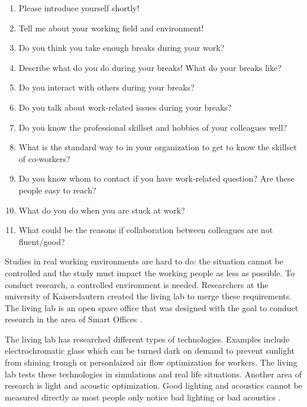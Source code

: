 \documentclass[english]{tktltiki}
\begin{document}
\begin{enumerate}
\item Please introduce yourself shortly!
\item Tell me about your working field and environment! 
\item Do you think you take enough breaks during your work? 
\item Describe what do you do during your breaks! What do your breaks like? 
\item Do you interact with others during your breaks? 
\item Do you talk about work-related issues during your breaks? 
\item Do you know the professional skillset and hobbies of your colleagues well?
\item What is the standard way to in your organization to get to know the skillset of co-workers? 
\item Do you know whom to contact if you have work-related question? Are these people easy to reach? 
\item What do you do when you are stuck at work? 
\item What could be the reasons if collaboration between colleagues are not fluent/good? 
\end{enumerate}

\label{sec:related-work}
Studies in real working environments are hard to do: the situation cannot be controlled and the 
study must impact the working people as less as possible. To conduct research, a controlled 
environment is needed. Researchers at the university of Kaiserslautern created the living lab to 
merge these requirements. The living lab is an open space office that was designed with the goal to 
conduct research in the area of Smart Offices \cite{living-lab}.

The living lab has researched different types of technologies. Examples include electrochromatic 
glass which can be turned dark on demand to prevent sunlight from shining trough or personlaized air 
flow optimization for workers. The living lab tests these technologies in simulations and real life 
situations. Another area of research is light and acoustic optimization. Good lighting and acoustics 
cannot be measured directly as most people only notice bad lighting or bad acoustics \cite{living-lab}.
\end{document}
